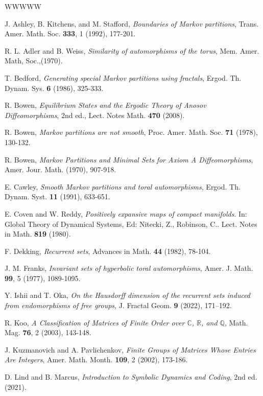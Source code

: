 \documentclass{article}
\def\Q{\mathbb{Q}}
\def\C{\mathbb{C}}
\def\R{\mathbb{R}}
\begin{document}
\begin{thebibliography}{WWWWW}

     J. Ashley, B. Kitchens, and M. Stafford, {\em Boundaries of Markov partitions}, Trans. Amer. Math. Soc. {\bf 333}, 1 (1992), 177-201.

     R. L. Adler and B. Weiss, {\em Similarity of automorphisms of the torus}, Mem. Amer. Math, Soc.,(1970).

     T. Bedford, {\em Generating special Markov partitions using fractals}, Ergod. Th.  Dynam. Sys. {\bf 6} (1986), 325-333. 
    
     R. Bowen, {\em Equilibrium States and the Ergodic Theory of Anosov Diffeomorphisms}, 2nd ed., Lect. Notes Math. {\bf 470} (2008). 

     R. Bowen, {\em Markov partitions are not smooth}, Proc. Amer. Math. Soc. {\bf 71} (1978), 130-132.

     R. Bowen, {\em Markov Partitions and Minimal Sets for Axiom A Diffeomorphisms}, Amer. Jour. Math. (1970), 907-918.
    
     E. Cawley, {\em Smooth Markov partitions and toral automorphisms}, Ergod. Th. Dynam. Syst. {\bf 11} (1991), 633-651.

     E. Coven and W. Reddy, {\em Positively expansive maps of compact manifolds}.  In: Global Theory of Dynamical Systems, Ed: Nitecki, Z., Robinson, C.. Lect. Notes in Math. {\bf 819} (1980). 

     F. Dekking, {\em Recurrent sets}, Advances in Math. {\bf 44} (1982), 78-104.

     J. M. Franks, {\em Invariant sets of hyperbolic toral automorphisms}, Amer. J. Math. {\bf 99}, 5 (1977), 1089-1095.
    
     Y. Ishii and T. Oka, {\em On the Hausdorff dimension of the recurrent sets induced from endomorphisms of free groups},
    J. Fractal Geom. {\bf 9} (2022), 171–192. 

     R. Koo, {\em A Classification of Matrices of Finite Order over $\C$, $\R$, and $\Q$}, Math. Mag. {\bf 76}, 2 (2003), 143-148.

     J. Kuzmanovich and A. Pavlichenkov, {\em Finite Groups of Matrices Whose Entries Are Integers}, Amer. Math. Month. {\bf 109}, 2 (2002), 173-186.

     D. Lind and B. Marcus, {\em Introduction to Symbolic Dynamics and Coding}, 2nd ed. (2021).


\end{thebibliography}
\end{document}
